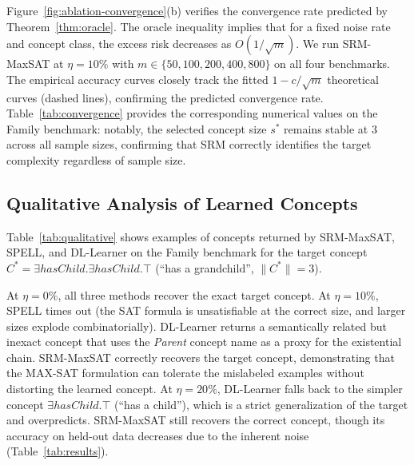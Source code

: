 \documentclass[accepted]{uai2026} %
\theoremstyle{definition}
\theoremstyle{remark}
\begin{document}
Figure~\ref{fig:ablation-convergence}(b) verifies
the convergence rate predicted by Theorem~\ref{thm:oracle}.  The
oracle inequality implies that for a fixed noise rate and concept
class, the excess risk decreases as $O(1/\sqrt{m})$.  We run
SRM-MaxSAT at $\eta = 10\%$ with $m \in \{50, 100, 200, 400, 800\}$
on all four benchmarks.  The empirical accuracy curves closely
track the fitted $1 - c/\sqrt{m}$ theoretical curves (dashed
lines), confirming the predicted convergence rate.
Table~\ref{tab:convergence} provides the corresponding numerical
values on the Family benchmark: notably, the selected concept size
$s^*$ remains stable at $3$ across all sample sizes, confirming
that SRM correctly identifies the target complexity regardless
of sample size.

\subsection{Qualitative Analysis of Learned
  Concepts}\label{app:qualitative}

Table~\ref{tab:qualitative} shows examples of
concepts returned by SRM-MaxSAT, SPELL, and DL-Learner on the
Family benchmark for the target concept
$C^* = \exists \mathit{hasChild}.\exists \mathit{hasChild}.\top$
(``has a grandchild'', $\|C^*\| = 3$).

At $\eta = 0\%$, all three methods recover the
exact target concept.  At $\eta = 10\%$, SPELL times out (the
SAT formula is unsatisfiable at the correct size, and larger
sizes explode combinatorially).  DL-Learner returns a
semantically related but inexact concept that uses the
\textit{Parent} concept name as a proxy for the existential
chain.  SRM-MaxSAT correctly recovers the target concept,
demonstrating that the MAX-SAT formulation can tolerate the
mislabeled examples without distorting the learned concept.
At $\eta = 20\%$, DL-Learner falls back to the simpler
concept $\exists \mathit{hasChild}.\top$ (``has a child''),
which is a strict generalization of the target and
overpredicts.  SRM-MaxSAT still recovers the correct concept,
though its accuracy on held-out data decreases due to the
inherent noise (Table~\ref{tab:results}).
\end{document}
